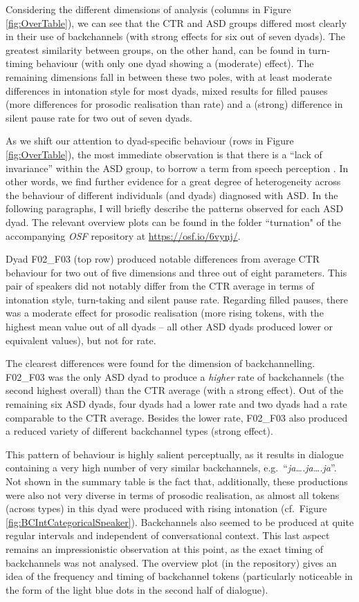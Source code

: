 Considering the different dimensions of analysis (columns in Figure \ref{fig:OverTable}), we can see that the CTR and ASD groups differed most clearly in their use of backchannels (with strong effects for six out of seven dyads). The greatest similarity between groups, on the other hand, can be found in turn-timing behaviour (with only one dyad showing a (moderate) effect). The remaining dimensions fall in between these two poles, with at least moderate differences in intonation style for most dyads, mixed results for filled pauses (more differences for prosodic realisation than rate) and a (strong) difference in silent pause rate for two out of seven dyads.

As we shift our attention to dyad-specific behaviour (rows in Figure \ref{fig:OverTable}), the most immediate observation is that there is a ``lack of invariance'' within the ASD group, to borrow a term from speech perception \citep{libermanPerceptionSpeechCode1967a}. In other words, we find further evidence for a great degree of heterogeneity across the behaviour of different individuals (and dyads) diagnosed with ASD. In the following paragraphs, I will briefly describe the patterns observed for each ASD dyad. The relevant overview plots can be found in the folder ``turnation" of the accompanying \textit{OSF} repository at \url{https://osf.io/6vynj/}.

Dyad F02\_F03 (top row) produced notable differences from average CTR behaviour for two out of five dimensions and three out of eight parameters. This pair of speakers did not notably differ from the CTR average in terms of intonation style, turn-taking and silent pause rate. Regarding filled pauses, there was a moderate effect for prosodic realisation (more rising tokens, with the highest mean value out of all dyads -- all other ASD dyads produced lower or equivalent values), but not for rate.

The clearest differences were found for the dimension of backchannelling. F02\_F03 was the only ASD dyad to produce a \emph{higher} rate of backchannels (the second highest overall) than the CTR average (with a strong effect). Out of the remaining six ASD dyads, four dyads had a lower rate and two dyads had a rate comparable to the CTR average. Besides the lower rate, F02\_F03 also produced a reduced variety of different backchannel types (strong effect).

This pattern of behaviour is highly salient perceptually, as it results in dialogue containing a very high number of very similar backchannels, e.g.~``\textit{ja\ldots.ja\ldots.ja}''. Not shown in the summary table is the fact that, additionally, these productions were also not very diverse in terms of prosodic realisation, as almost all tokens (across types) in this dyad were produced with rising intonation (cf.~Figure \ref{fig:BCIntCategoricalSpeaker}). Backchannels also seemed to be produced at quite regular intervals and independent of conversational context. This last aspect remains an impressionistic observation at this point, as the exact timing of backchannels was not analysed. The overview plot (in the repository) gives an idea of the frequency and timing of backchannel tokens (particularly noticeable in the form of the light blue dots in the second half of dialogue).

